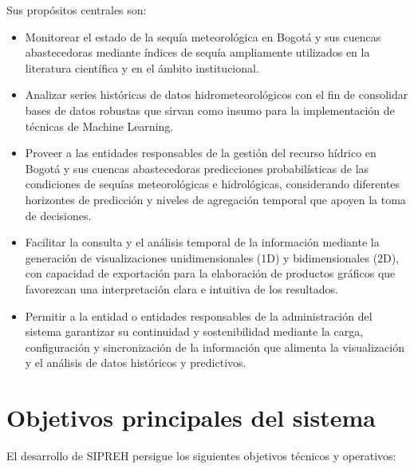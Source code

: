 Sus propósitos centrales son:

\begin{itemize}
    \item Monitorear el estado de la sequía meteorológica en Bogotá y sus cuencas abastecedoras mediante índices de sequía ampliamente utilizados en la literatura científica y en el ámbito institucional.
    \item Analizar series históricas de datos hidrometeorológicos con el fin de consolidar bases de datos robustas que sirvan como insumo para la implementación de técnicas de Machine Learning.
    \item Proveer a las entidades responsables de la gestión del recurso hídrico en Bogotá y sus cuencas abastecedoras predicciones probabilísticas de las condiciones de sequías meteorológicas e hidrológicas, considerando diferentes horizontes de predicción y niveles de agregación temporal que apoyen la toma de decisiones.
    \item Facilitar la consulta y el análisis temporal de la información mediante la generación de visualizaciones unidimensionales (1D) y bidimensionales (2D), con capacidad de exportación para la elaboración de productos gráficos que favorezcan una interpretación clara e intuitiva de los resultados.
    \item Permitir a la entidad o entidades responsables de la administración del sistema garantizar su continuidad y sostenibilidad mediante la carga, configuración y sincronización de la información que alimenta la visualización y el análisis de datos históricos y predictivos.
\end{itemize}

\section{Objetivos principales del sistema}
\label{sec:objetivos}

El desarrollo de SIPREH persigue los siguientes objetivos técnicos y operativos:

